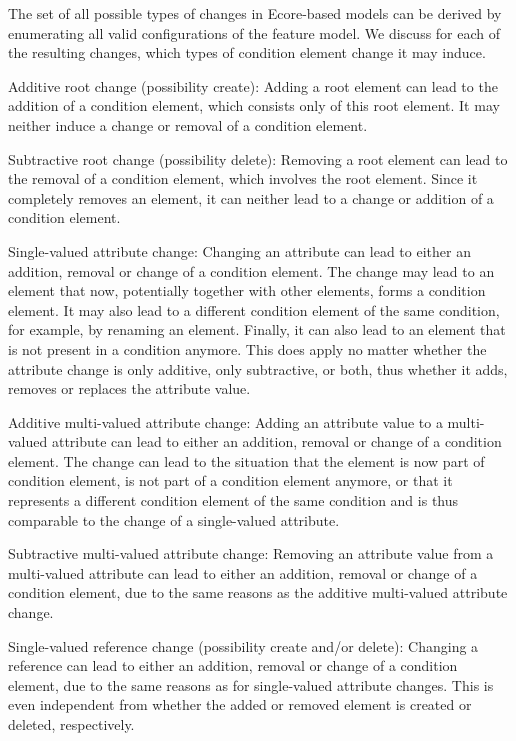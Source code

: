 The set of all possible types of changes in Ecore-based models can be derived by enumerating all valid configurations of the feature model.
We discuss for each of the resulting changes, which types of condition element change it may induce.
\begin{properdescription}
    \item[Additive root change (possibility create):] Adding a root element can lead to the addition of a condition element, which consists only of this root element. It may neither induce a change or removal of a condition element.
    \item[Subtractive root change (possibility delete):] Removing a root element can lead to the removal of a condition element, which involves the root element. Since it completely removes an element, it can neither lead to a change or addition of a condition element.
    \item[Single-valued attribute change:] Changing an attribute can lead to either an addition, removal or change of a condition element. The change may lead to an element that now, potentially together with other elements, forms a condition element. It may also lead to a different condition element of the same condition, for example, by renaming an element. Finally, it can also lead to an element that is not present in a condition anymore. This does apply no matter whether the attribute change is only additive, only subtractive, or both, thus whether it adds, removes or replaces the attribute value.
    \item[Additive multi-valued attribute change:] Adding an attribute value to a multi-valued attribute can lead to either an addition, removal or change of a condition element. The change can lead to the situation that the element is now part of condition element, is not part of a condition element anymore, or that it represents a different condition element of the same condition and is thus comparable to the change of a single-valued attribute.
    \item[Subtractive multi-valued attribute change:] Removing an attribute value from a multi-valued attribute can lead to either an addition, removal or change of a condition element, due to the same reasons as the additive multi-valued attribute change.
    \item[Single-valued reference change (possibility create and/or delete):] Changing a reference can lead to either an addition, removal or change of a condition element, due to the same reasons as for single-valued attribute changes. This is even independent from whether the added or removed element is created or deleted, respectively.

\end{properdescription}
